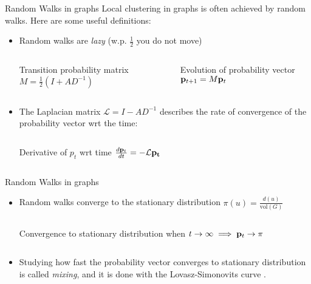 \documentclass[../main.tex]{subfiles}
\begin{document}
    \begin{frame}{Random Walks in graphs}
        Local clustering in graphs is often achieved by random walks. Here are some useful definitions:
        \begin{itemize}
            \item Random walks are \textit{lazy} (w.p. $\frac{1}{2}$ you do not move)
            
            \begin{columns}
                \begin{block}{Transition probability matrix}
                    $M = \frac{1}{2}(I + AD^{-1})$ 
                \end{block}
                \begin{block}{Evolution of probability vector}
                    $\bold{p}_{t+1} = M \bold{p}_t$
                \end{block}
            \end{columns}
            \item The Laplacian matrix $\mathcal{L}=I - AD^{-1}$ describes the rate of convergence of the probability vector wrt the time:
            \begin{columns}
                \begin{block}{Derivative of $p_t$ wrt time}
                    $\frac{d \bold{p}_t}{d t} = - \mathcal{L} \bold{p_t}$
                \end{block}
            \end{columns}
        \end{itemize}
    \end{frame}
    
    
    \begin{frame}{Random Walks in graphs}
        \begin{itemize}
            \item Random walks converge to the stationary distribution $\pi(u) = \frac{d(u)}{\text{vol}(G)}$
                \begin{columns}
                    \begin{block}{Convergence to stationary distribution}
                        when $t\to\infty \implies \bold{p}_t\to \pi$
                    \end{block}
                \end{columns}
            \item Studying how fast the probability vector converges to stationary distribution is called \textit{mixing}, and it is done with the Lovasz-Simonovits curve \cite{Lovsz1993RandomWI}.
        \end{itemize}
        
    \end{frame}
    
\end{document}
